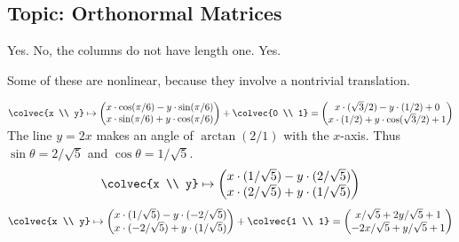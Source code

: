 \subsection{Topic: Orthonormal Matrices}
\begin{ans}{1}
      \begin{exparts}
        \partsitem Yes.
        \partsitem No, the columns do not have length one.
        \partsitem Yes.
      \end{exparts}
    
\end{ans}
\begin{ans}{2}
      Some of these are nonlinear,
      because they involve a nontrivial translation.
      \begin{exparts}
        \partsitem
          $\colvec{x \\ y}
           \mapsto
           \begin{pmatrix}
             x\cdot\cos(\pi/6)-y\cdot\sin(\pi/6) \\
             x\cdot\sin(\pi/6)+y\cdot\cos(\pi/6)
           \end{pmatrix}
           +\colvec{0 \\ 1}
           =\begin{pmatrix}
             x\cdot(\sqrt{3}/2)-y\cdot(1/2)+0 \\
             x\cdot(1/2)+y\cdot\cos(\sqrt{3}/2)+1
           \end{pmatrix}$
        \partsitem The line $y=2x$ makes an angle of $\arctan(2/1)$
          with the $x$-axis.
          Thus $\sin\theta=2/\sqrt{5}$ and $\cos\theta=1/\sqrt{5}$.
          \begin{equation*}
          \colvec{x \\ y}
           \mapsto
           \begin{pmatrix}
             x\cdot(1/\sqrt{5})-y\cdot(2/\sqrt{5}) \\
             x\cdot(2/\sqrt{5})+y\cdot(1/\sqrt{5})
           \end{pmatrix}
           \end{equation*}
        \partsitem
           $\colvec{x \\ y}
           \mapsto
           \begin{pmatrix}
             x\cdot(1/\sqrt{5})-y\cdot(-2/\sqrt{5}) \\
             x\cdot(-2/\sqrt{5})+y\cdot(1/\sqrt{5})
           \end{pmatrix}
           +\colvec{1 \\ 1}
           =\begin{pmatrix}
             x/\sqrt{5}+2y/\sqrt{5}+1 \\
             -2x/\sqrt{5}+y/\sqrt{5}+1
           \end{pmatrix}$
      \end{exparts}
    
\end{ans}
